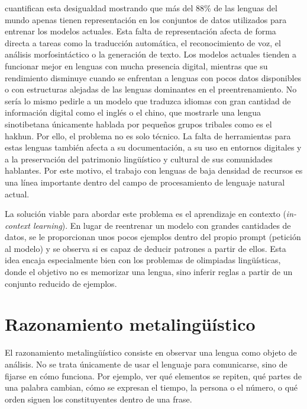 \citet{joshi2020state} cuantifican esta desigualdad mostrando que más del 88\% de las lenguas del mundo apenas tienen representación en los conjuntos de datos utilizados para entrenar los modelos actuales. Esta falta de representación afecta de forma directa a tareas como la traducción automática, el reconocimiento de voz, el análisis morfosintáctico o la generación de texto. Los modelos actuales tienden a funcionar mejor en lenguas con mucha presencia digital, mientras que su rendimiento disminuye cuando se enfrentan a lenguas con pocos datos disponibles o con estructuras alejadas de las lenguas dominantes en el preentrenamiento. No sería lo mismo pedirle a un modelo que traduzca idiomas con gran cantidad de información digital como el inglés o el chino, que mostrarle una lengua sinotibetana únicamente hablada por pequeños grupos tribales como es el hakhun. Por ello, el problema no es solo técnico. La falta de herramientas para estas lenguas también afecta a su documentación, a su uso en entornos digitales y a la preservación del patrimonio lingüístico y cultural de sus comunidades hablantes. Por este motivo, el trabajo con lenguas de baja densidad de recursos es una línea importante dentro del campo de procesamiento de lenguaje natural actual.

La solución viable para abordar este problema es el aprendizaje en contexto (\textit{in-context learning}). En lugar de reentrenar un modelo con grandes cantidades de datos, se le proporcionan unos pocos ejemplos dentro del propio prompt (petición al modelo) y se observa si es capaz de deducir patrones a partir de ellos. Esta idea encaja especialmente bien con los problemas de olimpiadas lingüísticas, donde el objetivo no es memorizar una lengua, sino inferir reglas a partir de un conjunto reducido de ejemplos.

\section{Razonamiento metalingüístico}
\label{sec:metalinguistico}

El razonamiento metalingüístico consiste en observar una lengua como objeto de análisis. No se trata únicamente de usar el lenguaje para comunicarse, sino de fijarse en cómo funciona. Por ejemplo, ver qué elementos se repiten, qué partes de una palabra cambian, cómo se expresan el tiempo, la persona o el número, o qué orden siguen los constituyentes dentro de una frase.

